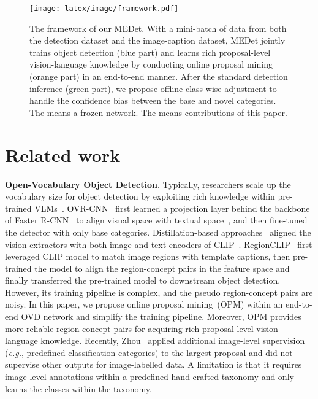 \documentclass[10pt,twocolumn,letterpaper]{article}
\begin{document}
\begin{figure*}
     \centering
     \texttt{[image: latex/image/framework.pdf]}
     \vspace{-0.5em}
     \caption{The framework of our MEDet.
     With a mini-batch of data from both the detection dataset and the image-caption dataset, MEDet jointly trains object detection (\textcolor[RGB]{17,160,255}{blue} part) and learns rich proposal-level vision-language knowledge by conducting online proposal mining (\textcolor[RGB]{239,115,33}{orange} part) in an end-to-end manner. After the standard detection inference (\textcolor[RGB]{153, 204, 153}{green} part), we propose offline class-wise adjustment to handle the confidence bias between the base and novel categories. The \textbf{\textcolor[RGB]{10,112,192}{}} means a frozen network. The \textbf{\textcolor[RGB]{255,232,0}{}} means contributions of this paper. }
\label{fig:framework}
     \vspace{-1.0em}
\end{figure*}












%
 




\section{Related work}

\textbf{Open-Vocabulary Object Detection}.
Typically, researchers scale up the vocabulary size for object detection by exploiting rich knowledge within pre-trained VLMs~\cite{clip,pixelbert,gao2022pyramidclip}.
OVR-CNN~\cite{ovrcnn} first learned a projection layer behind the backbone of Faster R-CNN~\cite{fasterrcnn} to align visual space with textual space~\cite{pixelbert}, and then fine-tuned the detector with only base categories.
Distillation-based approaches~\cite{vild,zsdyolo} aligned the vision extractors with both image and text encoders of CLIP~\cite{clip}. 
RegionCLIP~\cite{regionCLIP} first leveraged CLIP model to match image regions with template captions, then pre-trained the model to align the region-concept pairs in the feature space and finally transferred the pre-trained model to downstream object detection.
However, its training pipeline is complex, and the pseudo region-concept pairs are noisy.
In this paper, we propose online proposal mining~(OPM) within an end-to-end OVD network and simplify the training pipeline.
Moreover, OPM provides more reliable region-concept pairs for acquiring rich proposal-level vision-language knowledge.
Recently, Zhou~\etal\cite{detic} applied additional
image-level supervision (\textit{e.g.}, predefined classification categories) to the largest proposal and did not supervise other outputs for image-labelled data. 
A limitation is that it requires image-level annotations within a predefined hand-crafted taxonomy and only learns the classes within the taxonomy. 
\end{document}
